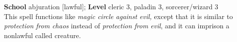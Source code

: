 \textbf{School} abjuration [lawful]; \textbf{Level} cleric 3, paladin 3, sorcerer/wizard 3\\
This spell functions like \textit{magic circle against evil, }except that it is similar to \textit{protection from chaos }instead of \textit{protection from evil}, and it can imprison a nonlawful called creature.\\
